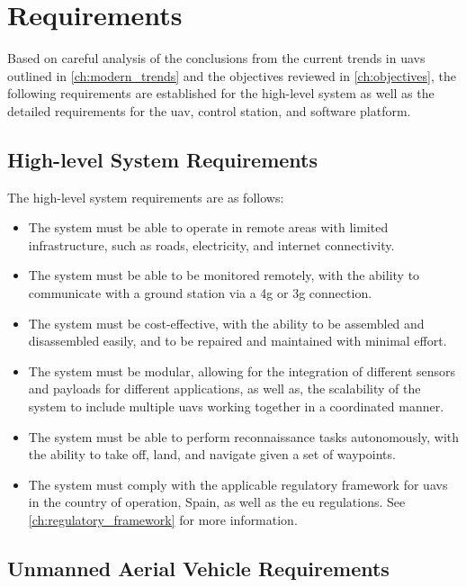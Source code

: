 \chapter{Requirements}

Based on careful analysis of the conclusions from the current trends in \glspl{uav} outlined in \cref{ch:modern_trends} and the objectives reviewed in \cref{ch:objectives}, the following requirements are established for the high-level system as well as the detailed requirements for the \gls{uav}, control station, and software platform.

\section{High-level System Requirements}

The high-level system requirements are as follows:

\begin{itemize}
  \item The system must be able to operate in remote areas with limited infrastructure, such as roads, electricity, and internet connectivity.

  \item The system must be able to be monitored remotely, with the ability to communicate with a ground station via a \gls{4g} or \gls{3g} connection.

  \item The system must be cost-effective, with the ability to be assembled and disassembled easily, and to be repaired and maintained with minimal effort.

  \item The system must be modular, allowing for the integration of different sensors and payloads for different applications, as well as, the scalability of the system to include multiple \glspl{uav} working together in a coordinated manner.

  \item The system must be able to perform reconnaissance tasks autonomously, with the ability to take off, land, and navigate given a set of waypoints.

  \item The system must comply with the applicable regulatory framework for \glspl{uav} in the country of operation, Spain, as well as the \gls{eu} regulations. See \cref{ch:regulatory_framework} for more information.
\end{itemize}

\section{Unmanned Aerial Vehicle Requirements}


